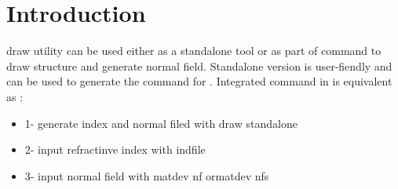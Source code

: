 \section{Introduction}
\textsf{draw} utility can be used either as a standalone tool or as part of \afmm command to draw structure and generate normal field. Standalone version is user-fiendly and can be used to generate the command for \afmm. Integrated command in \afmm is equivalent as :
\begin{itemize}
\item 1- generate index and normal filed with \textsf{draw} standalone
\item 2- input refractinve index with \textsf{indfile}
\item 3- input normal field with \textsf{matdev nf} or\textsf{matdev nfs}
\end {itemize}
